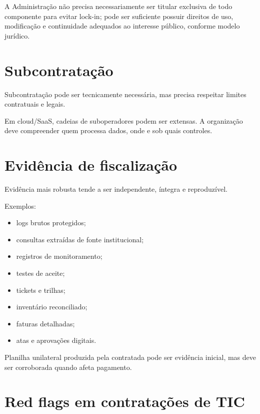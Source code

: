 A Administração não precisa necessariamente ser titular exclusiva de todo componente para evitar lock-in; pode ser suficiente possuir direitos de uso, modificação e continuidade adequados ao interesse público, conforme modelo jurídico.

\section{Subcontratação}

Subcontratação pode ser tecnicamente necessária, mas precisa respeitar limites contratuais e legais.

Em cloud/SaaS, cadeias de suboperadores podem ser extensas. A organização deve compreender quem processa dados, onde e sob quais controles.

\section{Evidência de fiscalização}

Evidência mais robusta tende a ser independente, íntegra e reproduzível.

Exemplos:
\begin{itemize}
\item logs brutos protegidos;
\item consultas extraídas de fonte institucional;
\item registros de monitoramento;
\item testes de aceite;
\item tickets e trilhas;
\item inventário reconciliado;
\item faturas detalhadas;
\item atas e aprovações digitais.
\end{itemize}

Planilha unilateral produzida pela contratada pode ser evidência inicial, mas deve ser corroborada quando afeta pagamento.

\section{Red flags em contratações de TIC}

